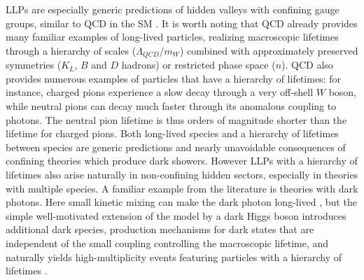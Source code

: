 LLPs are especially generic predictions of hidden valleys with confining gauge groups, similar to QCD in the SM
\cite{Strassler:2006im}. It is worth noting that QCD already provides many familiar examples of
long-lived particles, realizing macroscopic lifetimes through a hierarchy of scales ($\Lambda_{QCD}/m_W$) combined with
approximately preserved symmetries ($K_L$, $B$ and $D$ hadrons) or
restricted phase space ($n$). QCD also provides numerous
examples of particles that have a hierarchy of lifetimes: for
instance, charged pions experience a slow decay through a very off-shell $W$ boson, 
while neutral pions can decay much faster through its anomalous
coupling to photons.  The neutral pion lifetime is thus
orders of magnitude shorter than the lifetime for charged pions.  Both
long-lived species and a hierarchy of lifetimes between species are
generic predictions and nearly unavoidable consequences of confining
theories which produce dark showers.  However LLPs with a hierarchy of
lifetimes also arise naturally in non-confining hidden sectors,
especially in theories with multiple species.  A familiar example from
the literature is theories with dark photons.  Here small kinetic
mixing can make the dark photon long-lived \cite{} , but the
simple well-motivated extension of the model by a dark Higgs boson
introduces additional dark species,  production mechanisms for dark states that are independent of the small coupling controlling the macroscopic lifetime, and naturally yields
high-multiplicity events featuring particles with a hierarchy of
lifetimes \cite{Schabinger:2005ei,Chan:2011aa, Curtin:2014cca}.



